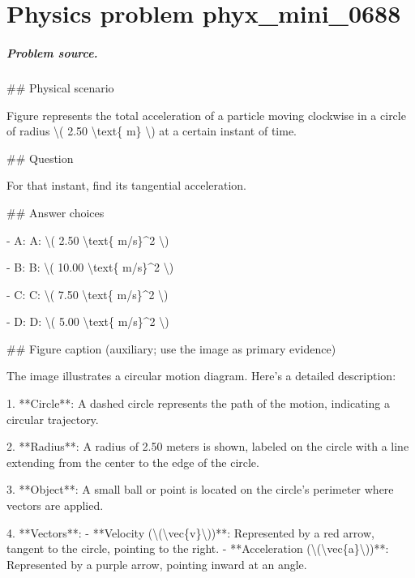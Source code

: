
\chapter{Physics problem phyx\_mini\_0688}
\label{ch:PhyXMiniProblems_problem_phyx_mini_0688}

\paragraph{Problem source.}
\#\# Physical scenario

Figure represents the total acceleration of a particle moving clockwise in a circle of radius \textbackslash{}( 2.50 \textbackslash{}text\{ m\} \textbackslash{}) at a certain instant of time.

\#\# Question

For that instant, find its tangential acceleration.

\#\# Answer choices

- A: A: \textbackslash{}( 2.50 \textbackslash{}text\{ m/s\}\textasciicircum{}2 \textbackslash{})

- B: B: \textbackslash{}( 10.00 \textbackslash{}text\{ m/s\}\textasciicircum{}2 \textbackslash{})

- C: C: \textbackslash{}( 7.50 \textbackslash{}text\{ m/s\}\textasciicircum{}2 \textbackslash{})

- D: D: \textbackslash{}( 5.00 \textbackslash{}text\{ m/s\}\textasciicircum{}2 \textbackslash{})

\#\# Figure caption (auxiliary; use the image as primary evidence)

The image illustrates a circular motion diagram. Here's a detailed description:

1. **Circle**: A dashed circle represents the path of the motion, indicating a circular trajectory.

2. **Radius**: A radius of 2.50 meters is shown, labeled on the circle with a line extending from the center to the edge of the circle.

3. **Object**: A small ball or point is located on the circle's perimeter where vectors are applied.

4. **Vectors**:
   - **Velocity (\textbackslash{}(\textbackslash{}vec\{v\}\textbackslash{}))**: Represented by a red arrow, tangent to the circle, pointing to the right.
   - **Acceleration (\textbackslash{}(\textbackslash{}vec\{a\}\textbackslash{}))**: Represented by a purple arrow, pointing inward at an angle.

